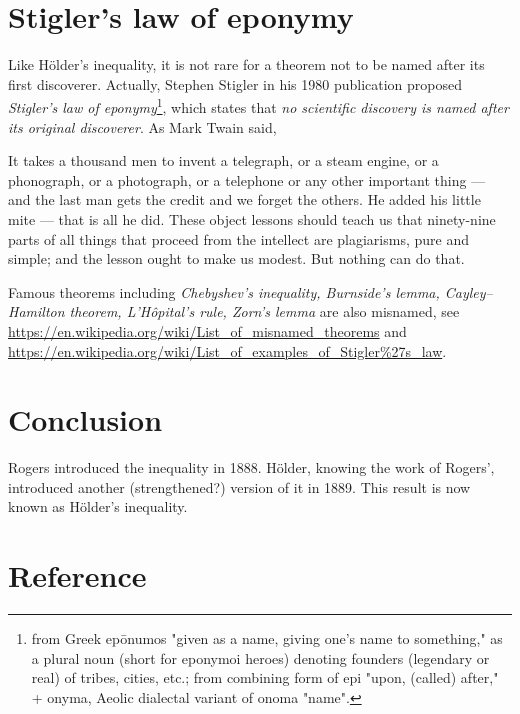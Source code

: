 \section{Stigler's law of eponymy}

Like Hölder's inequality, it is not rare for a theorem not to be named after its first discoverer. Actually, Stephen Stigler in his 1980 publication proposed \textit{Stigler's law of eponymy}\footnote{from Greek epōnumos "given as a name, giving one's name to something," as a plural noun (short for eponymoi heroes) denoting founders (legendary or real) of tribes, cities, etc.; from combining form of epi "upon, (called) after," + onyma, Aeolic dialectal variant of onoma "name".}, which states that \textit{no scientific discovery is named after its original discoverer}. As Mark Twain said,
\begin{qte}
    It takes a thousand men to invent a telegraph, or a steam engine, or a phonograph, or a photograph, or a telephone or any other important thing — and the last man gets the credit and we forget the others. He added his little mite — that is all he did. These object lessons should teach us that ninety-nine parts of all things that proceed from the intellect are plagiarisms, pure and simple; and the lesson ought to make us modest. But nothing can do that.
\end{qte}

Famous theorems including \textit{Chebyshev's inequality, Burnside's lemma, Cayley–Hamilton theorem, L'Hôpital's rule, Zorn's lemma} are also misnamed, see \url{https://en.wikipedia.org/wiki/List_of_misnamed_theorems} and \url{https://en.wikipedia.org/wiki/List_of_examples_of_Stigler%27s_law}.

\section{Conclusion}

Rogers introduced the inequality in 1888. Hölder, knowing the work of Rogers', introduced another (strengthened?) version of it in 1889. This result is now known as Hölder's inequality.

\section*{Reference}


